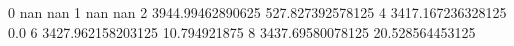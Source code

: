 0 nan nan
1 nan nan
2 3944.99462890625 527.827392578125
4 3417.167236328125 0.0
6 3427.962158203125 10.794921875
8 3437.69580078125 20.528564453125
